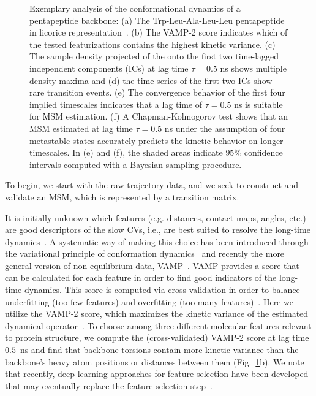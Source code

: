 \documentclass[9pt,tutorial]{livecoms}
\begin{document}
\begin{figure}
\caption{Exemplary analysis of the conformational dynamics of a pentapeptide backbone: (a) The Trp-Leu-Ala-Leu-Leu pentapeptide in licorice representation~\cite{humphrey1996vmd}.
(b) The VAMP-2 score indicates which of the tested featurizations contains the highest kinetic variance.
(c) The  sample density projected of the onto the first two time-lagged independent components (ICs) at lag time $\tau=0.5$ ns shows multiple density maxima and
(d) the time series of the first two ICs show rare transition events.
(e) The convergence behavior of the first four implied timescales indicates that a lag time of $\tau=0.5$ ns is suitable for MSM estimation.
(f) A Chapman-Kolmogorov test shows that an MSM estimated at lag time $\tau=0.5$ ns under the assumption of four metastable states accurately predicts the kinetic behavior on longer timescales.
In (e) and (f), the shaded areas indicate $95\%$ confidence intervals computed with a Bayesian sampling procedure.}
\label{fig:io-to-ck}
\end{figure}

To begin, we start with the raw trajectory data, and we seek to construct and validate an MSM, which is represented by a transition matrix.

It is initially unknown which features (e.g. distances, contact maps, angles, etc.) are good descriptors of the slow CVs, i.e., are best suited to resolve the long-time dynamics~\cite{NoeClementiReview}.
A systematic way of making this choice has been introduced through the variational principle of conformation dynamics~\cite{noe-vac,nueske-vamk} and recently the more general version of non-equilibrium data, VAMP~\cite{vamp-preprint}.
VAMP provides a score that can be calculated for each feature in order to find good indicators of the long-time dynamics.
This score is computed via cross-validation in order to balance underfitting (too few features) and overfitting (too many features)~\cite{gmrq}.
Here we utilize the VAMP-2 score, which maximizes the kinetic variance of the estimated dynamical operator~\cite{kinetic-maps}.
To choose among three different molecular features relevant to protein structure, we compute the (cross-validated) VAMP-2 score at lag time $0.5$~ns and find that backbone torsions contain more kinetic variance than the backbone's heavy atom positions or distances between them (Fig.~\ref{fig:io-to-ck}b).
We note that recently, deep learning approaches for feature selection have been developed that may eventually replace the feature selection step~\cite{vampnet,tae,hernandez-vde}.
\end{document}
